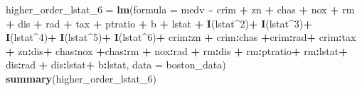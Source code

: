 \documentclass[
]{article}
\newenvironment{Shaded}{\begin{snugshade}}{\end{snugshade}}
\newcommand{\AttributeTok}[1]{\textcolor[rgb]{0.13,0.29,0.53}{#1}}
\newcommand{\DecValTok}[1]{\textcolor[rgb]{0.00,0.00,0.81}{#1}}
\newcommand{\FunctionTok}[1]{\textcolor[rgb]{0.13,0.29,0.53}{\textbf{#1}}}
\newcommand{\NormalTok}[1]{#1}
\newcommand{\OtherTok}[1]{\textcolor[rgb]{0.56,0.35,0.01}{#1}}
\newcommand{\SpecialCharTok}[1]{\textcolor[rgb]{0.81,0.36,0.00}{\textbf{#1}}}
\begin{document}
\begin{Shaded}
\begin{Highlighting}[]
\NormalTok{higher\_order\_lstat\_6 }\OtherTok{=} \FunctionTok{lm}\NormalTok{(}\AttributeTok{formula =}\NormalTok{ medv }\SpecialCharTok{\textasciitilde{}}\NormalTok{ crim }\SpecialCharTok{+}\NormalTok{ zn }\SpecialCharTok{+}\NormalTok{ chas }\SpecialCharTok{+}\NormalTok{ nox }\SpecialCharTok{+}\NormalTok{ rm }\SpecialCharTok{+}\NormalTok{ dis }\SpecialCharTok{+}\NormalTok{ rad }\SpecialCharTok{+}\NormalTok{ tax }\SpecialCharTok{+}\NormalTok{ ptratio }\SpecialCharTok{+}\NormalTok{ b }\SpecialCharTok{+}\NormalTok{ lstat }\SpecialCharTok{+} \FunctionTok{I}\NormalTok{(lstat}\SpecialCharTok{\^{}}\DecValTok{2}\NormalTok{)}\SpecialCharTok{+} \FunctionTok{I}\NormalTok{(lstat}\SpecialCharTok{\^{}}\DecValTok{3}\NormalTok{)}\SpecialCharTok{+} \FunctionTok{I}\NormalTok{(lstat}\SpecialCharTok{\^{}}\DecValTok{4}\NormalTok{)}\SpecialCharTok{+} \FunctionTok{I}\NormalTok{(lstat}\SpecialCharTok{\^{}}\DecValTok{5}\NormalTok{)}\SpecialCharTok{+} \FunctionTok{I}\NormalTok{(lstat}\SpecialCharTok{\^{}}\DecValTok{6}\NormalTok{)}\SpecialCharTok{+}\NormalTok{ crim}\SpecialCharTok{:}\NormalTok{zn }\SpecialCharTok{+}\NormalTok{ crim}\SpecialCharTok{:}\NormalTok{chas  }\SpecialCharTok{+}\NormalTok{crim}\SpecialCharTok{:}\NormalTok{rad}\SpecialCharTok{+}\NormalTok{ crim}\SpecialCharTok{:}\NormalTok{tax }\SpecialCharTok{+}\NormalTok{ zn}\SpecialCharTok{:}\NormalTok{dis}\SpecialCharTok{+}\NormalTok{ chas}\SpecialCharTok{:}\NormalTok{nox }\SpecialCharTok{+}\NormalTok{chas}\SpecialCharTok{:}\NormalTok{rm }\SpecialCharTok{+}\NormalTok{ nox}\SpecialCharTok{:}\NormalTok{rad }\SpecialCharTok{+}\NormalTok{ rm}\SpecialCharTok{:}\NormalTok{dis }\SpecialCharTok{+}\NormalTok{ rm}\SpecialCharTok{:}\NormalTok{ptratio}\SpecialCharTok{+}\NormalTok{ rm}\SpecialCharTok{:}\NormalTok{lstat}\SpecialCharTok{+}\NormalTok{ dis}\SpecialCharTok{:}\NormalTok{rad }\SpecialCharTok{+}\NormalTok{ dis}\SpecialCharTok{:}\NormalTok{lstat}\SpecialCharTok{+}\NormalTok{ b}\SpecialCharTok{:}\NormalTok{lstat, }\AttributeTok{data =}\NormalTok{ boston\_data)}
\FunctionTok{summary}\NormalTok{(higher\_order\_lstat\_6)}
\end{Highlighting}
\end{Shaded}
\end{document}
